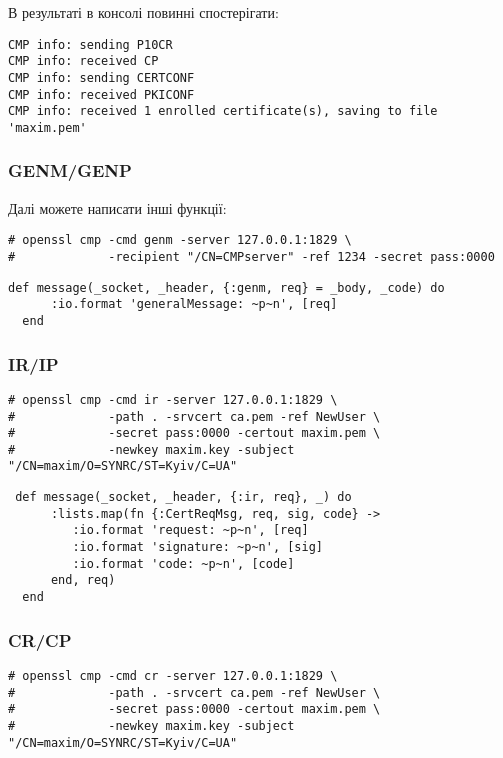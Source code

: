 В результаті в консолі повинні спостерігати:

\begin{lstlisting}
CMP info: sending P10CR
CMP info: received CP
CMP info: sending CERTCONF
CMP info: received PKICONF
CMP info: received 1 enrolled certificate(s), saving to file 'maxim.pem'
\end{lstlisting}

\subsubsection{GENM/GENP}

Далі можете написати інші функції:

\begin{lstlisting}
# openssl cmp -cmd genm -server 127.0.0.1:1829 \
#             -recipient "/CN=CMPserver" -ref 1234 -secret pass:0000
\end{lstlisting}

\begin{lstlisting}
def message(_socket, _header, {:genm, req} = _body, _code) do
      :io.format 'generalMessage: ~p~n', [req]
  end
\end{lstlisting}

\newpage
\subsubsection{IR/IP}

\begin{lstlisting}
# openssl cmp -cmd ir -server 127.0.0.1:1829 \
#             -path . -srvcert ca.pem -ref NewUser \
#             -secret pass:0000 -certout maxim.pem \
#             -newkey maxim.key -subject "/CN=maxim/O=SYNRC/ST=Kyiv/C=UA"
\end{lstlisting}

\begin{lstlisting}
 def message(_socket, _header, {:ir, req}, _) do
      :lists.map(fn {:CertReqMsg, req, sig, code} ->
         :io.format 'request: ~p~n', [req]
         :io.format 'signature: ~p~n', [sig]
         :io.format 'code: ~p~n', [code]
      end, req)
  end
\end{lstlisting}

\subsubsection{CR/CP}

\begin{lstlisting}
# openssl cmp -cmd cr -server 127.0.0.1:1829 \
#             -path . -srvcert ca.pem -ref NewUser \
#             -secret pass:0000 -certout maxim.pem \
#             -newkey maxim.key -subject "/CN=maxim/O=SYNRC/ST=Kyiv/C=UA"
\end{lstlisting}

